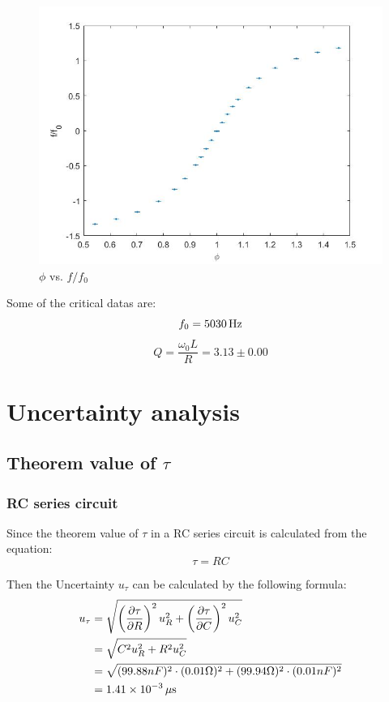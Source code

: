 \documentclass[12pt, a4paper]{article}
\begin{document}
\begin{figure}[H]
	\centering
	\includegraphics[scale = 0.4]{f_f0vsphi.jpg}
	\caption{$\phi$ vs. $f/f_0$}
\end{figure}

Some of the critical datas are:
$$f_0=5030\,\rm{Hz}$$
$$Q=\frac{\omega_0L}{R}=3.13\pm0.00$$

\section{Uncertainty analysis}
\subsection{Theorem value of $\tau$}
\subsubsection{RC series circuit}
Since the theorem value of $\tau$ in a RC series circuit is calculated from the equation:
$$\tau = RC$$

Then the Uncertainty $u_{\tau}$ can be calculated by the following formula:
\begin{align*}
	u_{\tau}&=\sqrt{\left(\frac{\partial \tau}{\partial R}\right)^2u_R^2+\left(\frac{\partial \tau}{\partial C}\right)^2u_C^2}\\
	&=\sqrt{C^2u_R^2+R^2u_C^2}\\
	&=\sqrt{(99.88nF)^2 \cdot (0.01\Omega)^2 + (99.94\Omega)^2 \cdot (0.01 nF)^2} \\
	&=1.41\times10^{-3}\,\rm{\mu s}
\end{align*}
\end{document}
